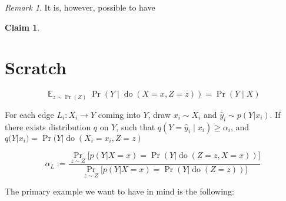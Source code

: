\documentclass{article}
\newcommand{\E}{\mathop{\mathbb E}}
\theoremstyle{plain}
\newtheorem{claim}[theorem]{Claim}
\theoremstyle{definition}
\theoremstyle{remark}
\newtheorem*{remark}{Remark}
\newcommand{\cdo}{\mathop{\mathrm{do}}}
\newcommand{\evt}[2]{#1\!\!=\!#2}
\begin{document}
\begin{remark}
	It is, however, possible to have 
\end{remark}


\begin{claim}
	
\end{claim}




\section*{Scratch}

	\[ \E_{z \sim \Pr(Z)}\Pr(Y \mid \cdo(X=x,Z=z)) = \Pr(Y \mid X) \]


%
%


For each edge $L_i : X_i \to Y$ coming into $Y$, draw $x_i \sim X_i$ and $\hat y_i \sim p(Y|x_i)$. 
If there exists distribution $q$ on $Y$, such that $q(Y=\hat y_i \mid x_i) \geq \alpha_i$, and $q(Y | x_i) = \Pr(Y | \cdo(\evt{X_i}{x_i}, \evt Zz) $


\[  \alpha_L :=  \frac{\Pr_{ z \sim Z} \Big[ p( Y | X=x) = \Pr(Y | \cdo(Z\!=\!z,X\!=\!x)) \Big]}{\Pr_{ z \sim Z} \Big[ p( Y | X=x) = \Pr(Y | \cdo(Z\!=\!z)) \Big]} \] 


The primary example we want to have in mind is the following:


\end{document}
